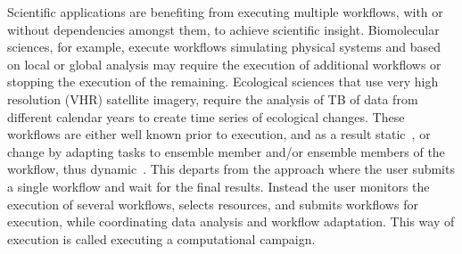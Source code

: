 Scientific applications are benefiting from executing multiple workflows, with or without dependencies amongst them, to achieve scientific insight.
Biomolecular sciences, for example, execute workflows simulating physical systems and based on local or global analysis may require the execution of additional workflows or stopping the execution of the remaining.
Ecological sciences that use very high resolution (VHR) satellite imagery, require the analysis of TB of data from different calendar years to create time series of ecological changes.
These workflows are either well known prior to execution, and as a result static~\cite{paraskevakos2019workflow}, or change by adapting tasks to ensemble member and/or ensemble members of the workflow, thus dynamic~\cite{dakka2018high}.
This departs from the approach where the user submits a single workflow and wait for the final results.
Instead the user monitors the execution of several workflows, selects resources, and submits workflows for execution, while coordinating data analysis and workflow adaptation.
This way of execution is called executing a computational campaign.

